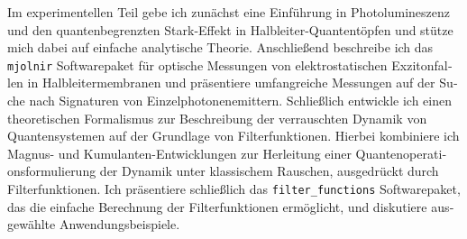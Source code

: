 \documentclass[a4paper,10pt]{article}
\begin{document}
\begin{german}
    Im experimentellen Teil gebe ich zunächst eine Einführung in Photolumineszenz und den quantenbegrenzten Stark-Effekt in Halbleiter-Quantentöpfen und stütze mich dabei auf einfache analytische Theorie.
    Anschließend beschreibe ich das \texttt{mjolnir} Softwarepaket für optische Messungen von elektrostatischen Exzitonfallen in Halbleitermembranen und präsentiere umfangreiche Messungen auf der Suche nach Signaturen von Einzelphotonenemittern.
    Schließlich entwickle ich einen theoretischen Formalismus zur Beschreibung der verrauschten Dynamik von Quantensystemen auf der Grundlage von Filterfunktionen.
    Hierbei kombiniere ich Magnus- und Kumulanten-Entwicklungen zur Herleitung einer Quantenoperationsformulierung der Dynamik unter klassischem Rauschen, ausgedrückt durch Filterfunktionen.
    Ich präsentiere schließlich das \texttt{filter\_functions} Softwarepaket, das die einfache Berechnung der Filterfunktionen ermöglicht, und diskutiere ausgewählte Anwendungsbeispiele.
\end{german}
\end{document}
